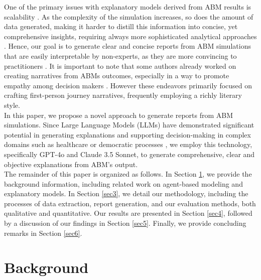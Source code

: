 \documentclass[preprint,12pt]{elsarticle}
\begin{document}
One of the primary issues with explanatory models derived from ABM results is scalability \cite{Bosmans2021}. As the complexity of the simulation increases, so does the amount of data generated, making it harder to distill this information into concise, yet comprehensive insights, requiring always more sophisticated analytical approaches \cite{Lee2015}. Hence, our goal is to generate clear and concise reports from ABM simulations that are easily interpretable by non-experts, as they are more convincing to practitioners \cite{Sun2016}. It is important to note that some authors already worked on creating narratives from ABMs outcomes, especially in a way to promote empathy among decision makers \cite{Anonymized2024}. However these endeavors primarily focused on crafting first-person journey narratives, frequently employing a richly literary style. \\

In this paper, we propose a novel approach to generate reports from ABM simulations. Since Large Language Models (LLMs) have demonstrated significant potential in generating explanations and supporting decision-making in complex domains such as healthcare \cite{Umerenkov2023} \cite{McLean2024} or democratic processes \cite{Yang2024}, we employ this technology, specifically GPT-4o and Claude 3.5 Sonnet, to generate comprehensive, clear and objective explanations from ABM's output.\\

The remainder of this paper is organized as follows. In Section \ref{sec2}, we provide the background information, including related work on agent-based modeling and explanatory models. In Section \ref{sec3}, we detail our methodology, including the processes of data extraction, report generation, and our evaluation methods, both qualitative and quantitative. Our results are presented in Section \ref{sec4}, followed by a discussion of our findings in Section \ref{sec5}. Finally, we provide concluding remarks in Section \ref{sec6}.

\section{Background}
\label{sec2}


\end{document}
